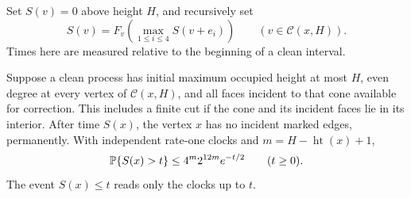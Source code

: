 Set \(S(v)=0\) above height \(H\), and recursively set
\begin{equation}\label{eq:schedule}
 S(v)=F_v\left(\max_{1\le i\le4}S(v+e_i)\right)
       \qquad(v\in\mathcal C(x,H)).
\end{equation}
Times here are measured relative to the beginning of a clean interval.

\begin{lemma}\label{lem:clearance}
Suppose a clean process has initial maximum occupied height at most
\(H\), even degree at every vertex of \(\mathcal C(x,H)\), and all
faces incident to that cone available for correction. This includes
a finite cut if the cone and its incident faces lie in its interior.
After time \(S(x)\), the vertex \(x\) has no incident marked edges,
permanently. With independent rate-one clocks and
\(m=H-\operatorname{ht}(x)+1\),
\begin{equation}\label{eq:clearance-tail}
 \mathbb P\{S(x)>t\}\le
 4^m2^{12m}e^{-t/2}\qquad(t\ge0).
\end{equation}
The event \(S(x)\le t\) reads only the clocks up to \(t\).
\end{lemma}
